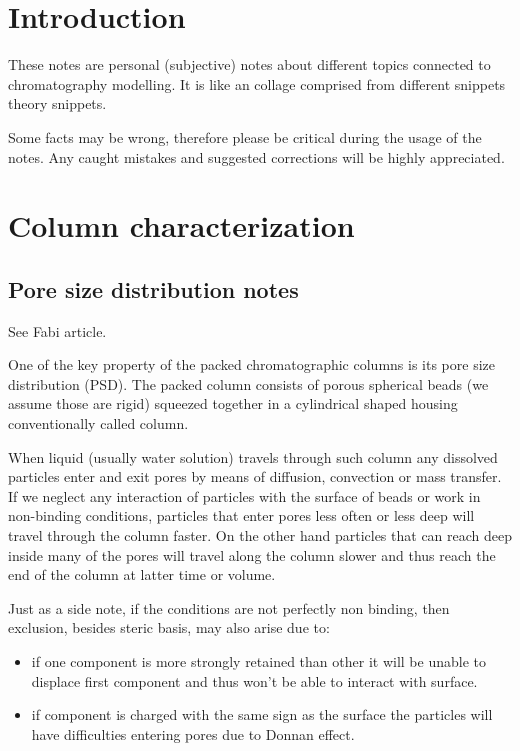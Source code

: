 \section{Introduction}

These notes are personal (subjective) notes about different topics connected to
chromatography modelling. It is like an collage comprised from different
snippets theory snippets.

Some facts may be wrong, therefore please be critical during the usage of the
notes. Any caught mistakes and suggested corrections will be highly appreciated.

\section{Column characterization}
\subsection{Pore size distribution notes}

See Fabi article.

One of the key property of the packed chromatographic columns is its pore size
distribution (PSD). The packed column consists of porous spherical beads (we
assume those are rigid) squeezed together in a cylindrical shaped housing
conventionally called column.

When liquid (usually water solution) travels through such column any
dissolved particles enter and exit pores by means of diffusion, convection or
mass transfer. If we neglect any interaction of particles with the surface of
beads or work in non-binding conditions, particles that enter pores less often
or less deep will travel through the column faster. On the other hand particles
that can reach deep inside many of the pores will travel along the column
slower and thus reach the end of the column at latter time or volume.

Just as a side note, if the conditions are not perfectly non binding, then
exclusion, besides steric basis, may also arise due to:
\begin{itemize}
    \item if one component is more strongly retained than
          other it will be unable to displace first component and thus won't be able to
          interact with surface.
    \item if component is charged with the same sign as the surface the
          particles will have difficulties entering pores due to Donnan effect.
\end{itemize}

